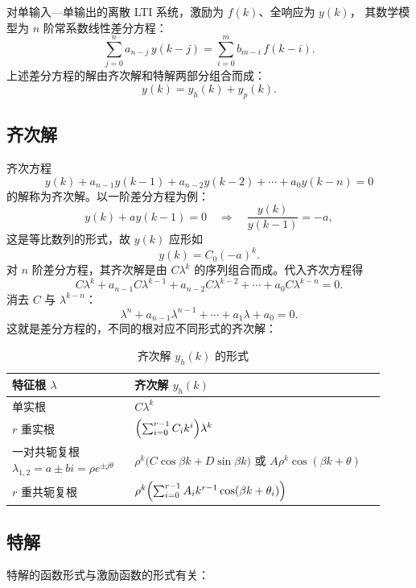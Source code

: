 对单输入—单输出的离散 LTI 系统，激励为 $f(k)$、全响应为 $y(k)$，
其数学模型为 $n$ 阶常系数线性差分方程：
\[
    \sum_{j=0}^{n}a_{n-j}\,y(k-j)=\sum_{i=0}^{m}b_{m-i}\,f(k-i).
\]
上述差分方程的解由齐次解和特解两部分组合而成：
\[
    y(k)=y_h(k)+y_p(k).
\]

\subsection{齐次解}

齐次方程
\[
    y(k)+a_{n-1}y(k-1)+a_{n-2}y(k-2)+\cdots+a_0y(k-n)=0
\]
的解称为齐次解。以一阶差分方程为例：
\[
    y(k)+ay(k-1)=0
    \quad\Longrightarrow\quad
    \frac{y(k)}{y(k-1)}=-a,
\]
这是等比数列的形式，故 $y(k)$ 应形如
\[
    y(k)=C_0(-a)^{k}.
\]
对 $n$ 阶差分方程，其齐次解是由 $C\lambda^{k}$ 的序列组合而成。代入齐次方程得
\[
    C\lambda^{k}+a_{n-1}C\lambda^{k-1}+a_{n-2}C\lambda^{k-2}+\cdots+a_0C\lambda^{k-n}=0 .
\]
消去 $C$ 与 $\lambda^{k-n}$：
\[
    \lambda^{n}+a_{n-1}\lambda^{n-1}+\cdots+a_1\lambda+a_0=0 .
\]
这就是差分方程的，不同的根对应不同形式的齐次解：

\begin{table}[htbp]
\centering
\caption{齐次解 $y_h(k)$ 的形式}
\small
\begin{tabular}{@{}p{0.30\linewidth}p{0.62\linewidth}@{}}
\toprule
特征根 $\lambda$ & 齐次解 $y_h(k)$ \\
\midrule
单实根 & $C\lambda^{k}$ \\
$r$ 重实根 & $\Bigl(\sum_{i=0}^{r-1}C_i k^{i}\Bigr)\lambda^{k}$ \\
一对共轭复根 $\lambda_{1,2}=a\pm bi=\rho e^{\pm j\theta}$ &
$\rho^{k}\bigl(C\cos\beta k+D\sin\beta k\bigr)$ 或 $A\rho^{k}\cos(\beta k+\theta)$ \\
$r$ 重共轭复根 &
$\rho^{k}\Bigl(\sum_{i=0}^{r-1}A_i k^{r-1}\cos(\beta k+\theta_i)\Bigr)$ \\
\bottomrule
\end{tabular}
\end{table}

\subsection{特解}

特解的函数形式与激励函数的形式有关：

